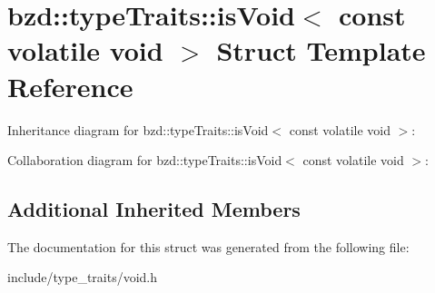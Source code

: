 \hypertarget{structbzd_1_1typeTraits_1_1isVoid_3_01const_01volatile_01void_01_4}{}\section{bzd\+:\+:type\+Traits\+:\+:is\+Void$<$ const volatile void $>$ Struct Template Reference}
\label{structbzd_1_1typeTraits_1_1isVoid_3_01const_01volatile_01void_01_4}


Inheritance diagram for bzd\+:\+:type\+Traits\+:\+:is\+Void$<$ const volatile void $>$\+:


Collaboration diagram for bzd\+:\+:type\+Traits\+:\+:is\+Void$<$ const volatile void $>$\+:
\subsection*{Additional Inherited Members}


The documentation for this struct was generated from the following file\+:\begin{DoxyCompactItemize}
\item 
include/type\+\_\+traits/void.\+h\end{DoxyCompactItemize}
